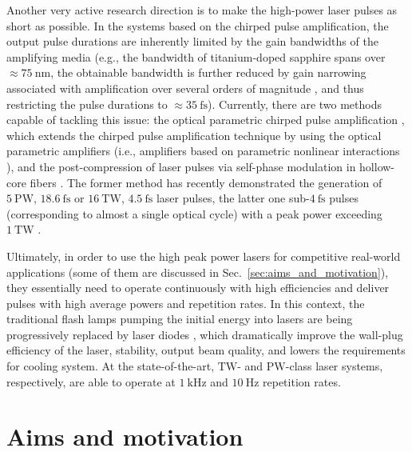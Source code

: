 \documentclass[10pt, a4paper, twoside, openright]{report}
\begin{document}
Another very active research direction is to make the high-power laser pulses as short as possible. In the systems based on the chirped pulse amplification, the output pulse durations are inherently limited by the gain bandwidths of the amplifying media (e.g., the bandwidth of titanium-doped sapphire spans over $ \approx 75 \ \mathrm{nm} $, the obtainable bandwidth is further reduced by gain narrowing associated with amplification over several orders of magnitude \cite{Hotz1965}, and thus restricting the pulse durations to $ \approx 35 \ \mathrm{fs} $). Currently, there are two methods capable of tackling this issue: the optical parametric chirped pulse amplification \cite{Dubietis1992}, which extends the chirped pulse amplification technique by using the optical parametric amplifiers (i.e., amplifiers based on parametric nonlinear interactions \cite{Giordmaine1965, Baumgartner1979}), and the post-compression of laser pulses via self-phase modulation in hollow-core fibers \cite{Nisoli1996}. The former method has recently demonstrated the generation of $ 5 \ \mathrm{PW} $, $ 18.6 \ \mathrm{fs} $ \cite{Zeng2017} or $ 16 \ \mathrm{TW} $, $ 4.5 \ \mathrm{fs} $ \cite{Rivas2017} laser pulses, the latter one sub-$ 4 \ \mathrm{fs} $ pulses (corresponding to almost a single optical cycle) with a peak power exceeding $ 1 \ \mathrm{TW} $ \cite{Ouille2020, Nagy2020}.

Ultimately, in order to use the high peak power lasers for competitive real-world applications (some of them are discussed in Sec.~\ref{sec:aims_and_motivation}), they essentially need to operate continuously with high efficiencies and deliver pulses with high average powers and repetition rates. In this context, the traditional flash lamps pumping the initial energy into lasers are being progressively replaced by laser diodes \cite{Byer1988}, which dramatically improve the wall-plug efficiency of the laser, stability, output beam quality, and lowers the requirements for cooling system. At the state-of-the-art, $ \mathrm{TW} $- and $ \mathrm{PW} $-class laser systems, respectively, are able to operate at $ 1 \ \mathrm{kHz} $ \cite{Budriunas2017, Toth2020} and $ 10 \ \mathrm{Hz} $ \cite{Haefner2017, Osvay2019} repetition rates.


\section{Aims and motivation\label{sec:aims_and_motivation}}
%
\end{document}
